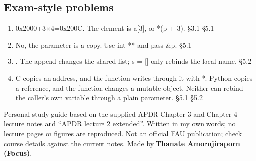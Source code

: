\documentclass[11pt]{article}
\begin{document}
\begin{keepsection}\subsection{Exam-style problems}

\begin{enumerate}
\item 0x2000+3\ensuremath{\times}4=0x200C. The element is a[3], or *(p + 3). \hfill{\small\color{FAUblue}§3.1} \hfill{\small\color{FAUblue}§5.1}
\item No, the parameter is a copy. Use int ** and pass \&p. \hfill{\small\color{FAUblue}§5.1}
\item [0, 1]. The append changes the shared list; s = [] only rebinds the local name. \hfill{\small\color{FAUblue}§5.2}
\item C copies an address, and the function writes through it with *. Python copies a reference, and the function changes a mutable object. Neither can rebind the caller’s own variable through a plain parameter. \hfill{\small\color{FAUblue}§5.1} \hfill{\small\color{FAUblue}§5.2}
\end{enumerate}

\end{keepsection}

\vfill{\small Personal study guide based on the supplied APDR Chapter 3 and Chapter 4 lecture notes and “APDR lecture 2 extended”. Written in my own words; no lecture pages or figures are reproduced. Not an official FAU publication; check course details against the current notes. Made by \textbf{Thanate Amornjiraporn (Focus)}.}
\end{document}
